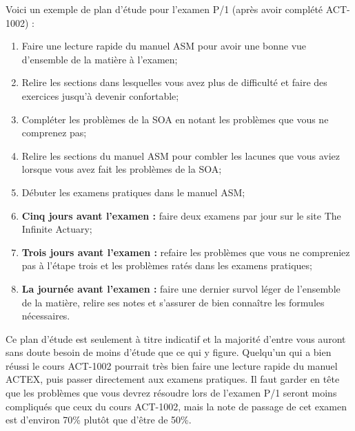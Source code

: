 Voici un exemple de plan d'étude pour l'examen P/1 (après avoir complété ACT-1002) :
\begin{enumerate}
\item Faire une lecture rapide du manuel ASM pour avoir une bonne vue d'ensemble de la matière à l'examen;
\item Relire les sections dans lesquelles vous avez plus de difficulté et faire des exercices jusqu'à devenir confortable;
\item Compléter les problèmes de la SOA en notant les problèmes que vous ne comprenez pas;
\item Relire les sections du manuel ASM pour combler les lacunes que vous aviez lorsque vous avez fait les problèmes de la SOA;
\item Débuter les examens pratiques dans le manuel ASM;
\item \textbf{Cinq jours avant l'examen :} faire deux examens par jour sur le site The Infinite Actuary;
\item \textbf{Trois jours avant l'examen :} refaire les problèmes que vous ne compreniez pas à l'étape trois et les problèmes ratés dans les examens pratiques;
\item \textbf{La journée avant l'examen :} faire une dernier survol léger de l'ensemble de la matière, relire ses notes et s'assurer de bien connaître les formules nécessaires.
\end{enumerate}
\vspace{\baselineskip}

Ce plan d'étude est seulement à titre indicatif et la majorité d'entre vous auront sans doute besoin de moins d'étude que ce qui y figure. Quelqu'un qui a bien réussi le cours ACT-1002 pourrait très bien faire une lecture rapide du manuel ACTEX, puis passer directement aux examens pratiques. Il faut garder en tête que les problèmes que vous devrez résoudre lors de l'examen P/1 seront moins compliqués que ceux du cours ACT-1002, mais la note de passage de cet examen est d'environ 70\% plutôt que d'être de 50\%. 

\newpage
